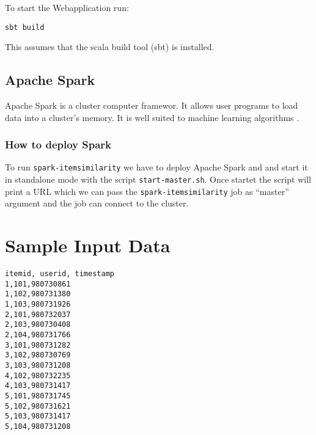 To start the Webapplication run:
\begin{verbatim}
sbt build 
\end{verbatim}
This assumes that the scala build tool (sbt) is installed.
\subsection{Apache Spark}
\label{sec:spark}
Apache Spark is a cluster computer framewor. It allows user programs to load data into a cluster's memory. It is well suited to machine learning algorithms \cite{Karau}.
\subsubsection{How to deploy Spark}
\label{sec:sparkdeploy}

To run \verb|spark-itemsimilarity| we have to deploy Apache Spark and and start it in standalone mode with the script \verb|start-master.sh|. Once startet the script will print a URL which we can pass the \verb|spark-itemsimilarity| job as ``master'' argument and the job can connect to the cluster. 

\section{Sample Input Data}
\label{sec:sampleinput}

\begin{lstlisting}[label=lst:sampledata]
itemid, userid, timestamp
1,101,980730861
1,102,980731380
1,103,980731926
2,101,980732037
2,103,980730408
2,104,980731766
3,101,980731282
3,102,980730769
3,103,980731208
4,102,980732235
4,103,980731417
5,101,980731745
5,102,980731621
5,103,980731417
5,104,980731208  
\end{lstlisting}

